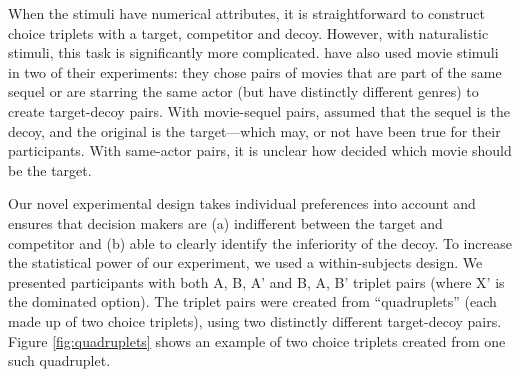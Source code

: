 \documentclass[12pt, a4paper]{article}
\begin{document}
When the stimuli have numerical attributes, it is straightforward to construct choice triplets with a target, competitor and decoy. However, with naturalistic stimuli, this task is significantly more complicated.  have also used movie stimuli in two of their experiments: they chose pairs of movies that are part of the same sequel or are starring the same actor (but have distinctly different genres) to create target-decoy pairs. With movie-sequel pairs, \citeauthor{Frederick2014} assumed that the sequel is the decoy, and the original is the target---which may, or not have been true for their participants. With same-actor pairs, it is unclear how \citeauthor{Frederick2014} decided which movie should be the target. 

Our novel experimental design takes individual preferences into account and ensures that decision makers are (a) indifferent between the target and competitor and (b) able to clearly identify the inferiority of the decoy. To increase the statistical power of our experiment, we used a within-subjects design. We presented participants with both A, B, A' and B, A, B' triplet pairs (where X' is the dominated option). The triplet pairs were created from ``quadruplets'' (each made up of two choice triplets), using two distinctly different target-decoy pairs. Figure \ref{fig:quadruplets} shows an example of two choice triplets created from one such quadruplet.

\end{document}
